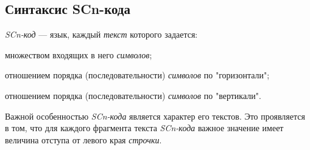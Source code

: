 \subsection{Синтаксис SCn-кода}
\label{sec_scn_syntax}

\textit{SCn-код} --- язык, каждый \textit{текст} которого задается:
\begin{textitemize}
	\item множеством входящих в него \textit{символов};
	\item отношением порядка (последовательности) \textit{символов} по "горизонтали"{};
	\item отношением порядка (последовательности) \textit{символов} по "вертикали"{}.
\end{textitemize}

\begin{SCn}
\end{SCn}

Важной особенностью \textit{SCn-кода} является  характер его текстов. Это проявляется в том, что для каждого фрагмента текста \textit{SCn-кода} важное значение имеет величина отступа от левого края \textit{строчки}.

